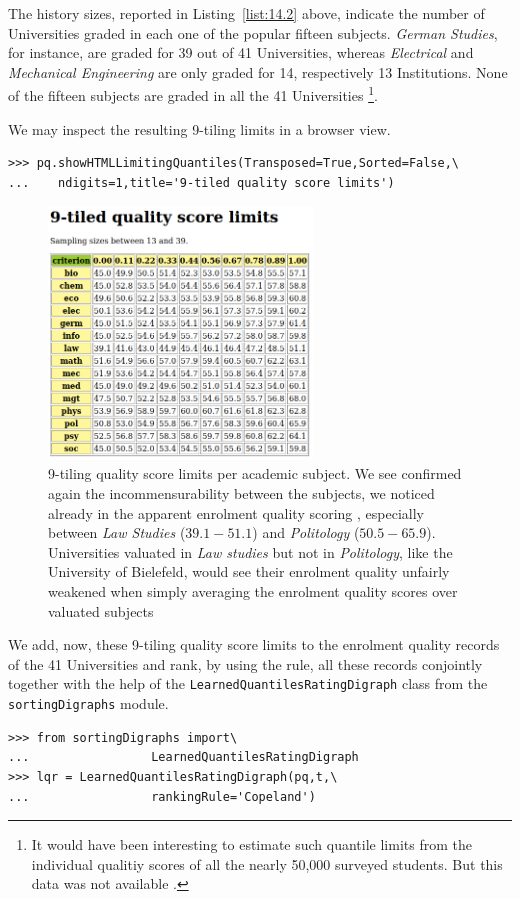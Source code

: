 The history sizes, reported in Listing~\vref{list:14.2} above, indicate the number of Universities graded in each one of the popular fifteen subjects. \emph{German Studies}, for instance, are graded for 39 out of 41 Universities, whereas \emph{Electrical} and \emph{Mechanical Engineering} are only graded for 14, respectively 13 Institutions. None of the fifteen subjects are graded in all the 41 Universities \footnote{It would have been interesting to estimate such quantile limits from the individual qualitiy scores of all the nearly 50,000 surveyed students. But this data was not available \citep{SPI-2004}.}. 

We may inspect the resulting 9-tiling limits in a browser view.
\begin{lstlisting}
>>> pq.showHTMLLimitingQuantiles(Transposed=True,Sorted=False,\
...	   ndigits=1,title='9-tiled quality score limits')
\end{lstlisting}
\begin{figure}[ht]
\sidecaption[t]
\includegraphics[width=7cm]{Figures/14-3-score9Limits.png}
\caption{9-tiling quality score limits per academic subject. We see confirmed again the incommensurability between the subjects, we noticed already in the apparent enrolment quality scoring , especially between \emph{Law Studies} ($39.1 - 51.1$) and \emph{Politology} ($50.5 - 65.9$). Universities valuated in \emph{Law studies} but not in \emph{Politology}, like the University of Bielefeld, would see their enrolment quality unfairly weakened when simply averaging the enrolment quality scores over valuated subjects}
\label{fig:14.3}       %
\end{figure}
We add, now, these 9-tiling quality score limits to the enrolment quality records of the 41 Universities and rank, by using the \Copeland rule, all these records conjointly together with the help of the \texttt{LearnedQuantilesRatingDigraph} class from the \texttt{sortingDigraphs} module.
\begin{lstlisting}
>>> from sortingDigraphs import\
...                 LearnedQuantilesRatingDigraph
>>> lqr = LearnedQuantilesRatingDigraph(pq,t,\
...                 rankingRule='Copeland')
\end{lstlisting}

